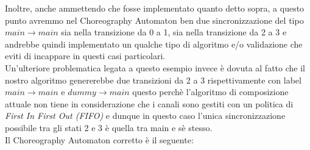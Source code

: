 Inoltre, anche ammettendo che fosse implementato quanto detto sopra, a questo punto avremmo nel Choreography Automaton ben due sincronizzazione del tipo $main \rightarrow main$ sia nella transizione da 0 a 1, sia nella transizione da 2 a 3 e andrebbe quindi implementato un qualche tipo di algoritmo e/o validazione che eviti di incappare in questi casi particolari.\\
Un'ulteriore problematica legata a questo esempio invece è dovuta al fatto che il nostro algoritmo genererebbe due transizioni da 2 a 3 rispettivamente con label $main \rightarrow main$ e $dummy \rightarrow main$ questo perchè l'algoritmo di composizione attuale non tiene in considerazione che i canali sono gestiti con un politica di \emph{First In First Out (FIFO)} e dunque in questo caso l'unica sincronizzazione possibile tra gli stati 2 e 3 è quella tra main e sè stesso.\bigskip \\
Il Choreography Automaton corretto è il seguente:
\begin{figure}[h!]
\end{figure}